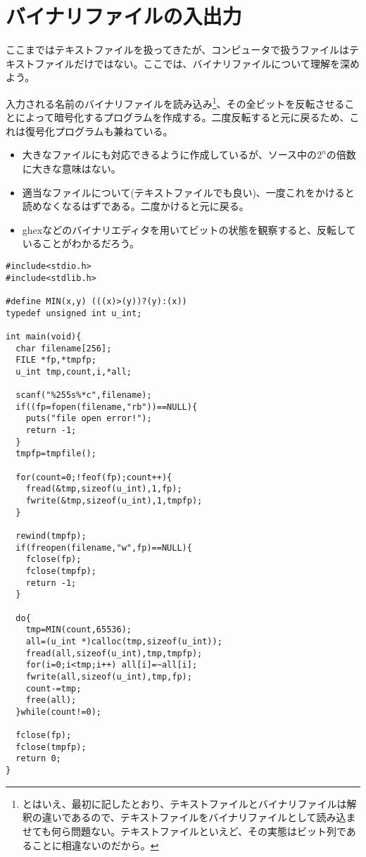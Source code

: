 \section{バイナリファイルの入出力}
ここまではテキストファイルを扱ってきたが、コンピュータで扱うファイルはテキストファイルだけではない。ここでは、バイナリファイルについて理解を深めよう。
\begin{boxnote}
入力される名前のバイナリファイルを読み込み\footnote{とはいえ、最初に記したとおり、テキストファイルとバイナリファイルは解釈の違いであるので、テキストファイルをバイナリファイルとして読み込ませても何ら問題ない。テキストファイルといえど、その実態はビット列であることに相違ないのだから。}、その全ビットを反転させることによって暗号化するプログラムを作成する。二度反転すると元に戻るため、これは復号化プログラムも兼ねている。
\end{boxnote}

\begin{boxnote}
\begin{itemize}
\item 大きなファイルにも対応できるように作成しているが、ソース中の$2^n$の倍数に大きな意味はない。
\item 適当なファイルについて(テキストファイルでも良い)、一度これをかけると読めなくなるはずである。二度かけると元に戻る。
\item ghexなどのバイナリエディタを用いてビットの状態を観察すると、反転していることがわかるだろう。
\end{itemize}
\begin{multicols}{2}
\begin{lstlisting}[caption=ビット反転プログラム,label=program12_2]
#include<stdio.h>
#include<stdlib.h>

#define MIN(x,y) (((x)>(y))?(y):(x))
typedef unsigned int u_int;

int main(void){
  char filename[256];
  FILE *fp,*tmpfp;
  u_int tmp,count,i,*all;

  scanf("%255s%*c",filename);
  if((fp=fopen(filename,"rb"))==NULL){
    puts("file open error!");
    return -1;
  }
  tmpfp=tmpfile();

  for(count=0;!feof(fp);count++){
    fread(&tmp,sizeof(u_int),1,fp);
    fwrite(&tmp,sizeof(u_int),1,tmpfp);
  }

  rewind(tmpfp);
  if(freopen(filename,"w",fp)==NULL){
    fclose(fp);
    fclose(tmpfp);
    return -1;
  }

  do{
    tmp=MIN(count,65536);
    all=(u_int *)calloc(tmp,sizeof(u_int));
    fread(all,sizeof(u_int),tmp,tmpfp);
    for(i=0;i<tmp;i++) all[i]=~all[i];
    fwrite(all,sizeof(u_int),tmp,fp);
    count-=tmp;
    free(all);
  }while(count!=0);

  fclose(fp);
  fclose(tmpfp);
  return 0;
}
\end{lstlisting} 
\end{multicols}
\end{boxnote}

